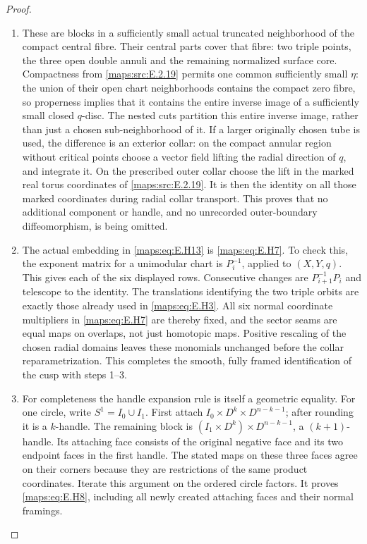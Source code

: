 \begin{proof}
\begin{enumerate}[label=\arabic*.,leftmargin=*]
\item These are blocks in a sufficiently small actual truncated
neighborhood of the compact central fibre.  Their central
parts cover that fibre: two triple points, the three open
double annuli and the remaining normalized surface core.
Compactness from \ref{maps:src:E.2.19} permits one common sufficiently small
$\eta$: the union of their open chart neighborhoods contains
the compact zero fibre, so properness implies that it contains
the entire inverse image of a sufficiently small closed
$q$-disc.  The nested cuts partition this entire inverse
image, rather than just a chosen sub-neighborhood of it.
If a larger originally chosen tube is used, the
difference is an exterior collar: on the compact annular
region without critical points choose a vector field lifting
the radial direction of $q$, and integrate it.  On the
prescribed outer collar choose the lift in the marked real
torus coordinates of \ref{maps:src:E.2.19}.  It is then the identity on all
those marked coordinates during radial collar transport.
This proves that no additional component or handle, and no
unrecorded outer-boundary diffeomorphism, is being omitted.

\item The actual embedding in \eqref{maps:eq:E.H13} is \eqref{maps:eq:E.H7}.  To check this,
the exponent matrix for a unimodular chart is $P_i^{-1}$,
applied to $(X,Y,q)$.  This gives each of the six displayed
rows.  Consecutive changes are $P_{i+1}^{-1}P_i$ and telescope
to the identity.  The translations identifying the two
triple orbits are exactly those already used in \eqref{maps:eq:E.H3}.
All six normal coordinate multipliers in \eqref{maps:eq:E.H7} are thereby
fixed, and the sector seams are equal maps on overlaps,
not just homotopic maps.  Positive rescaling of the chosen
radial domains leaves these monomials unchanged before
the collar reparametrization.  This completes the smooth,
fully framed identification of the cusp with steps 1--3.

\item For completeness the handle expansion rule is itself a
geometric equality.  For one circle, write $S^1=I_0\cup I_1$.
First attach $I_0\times D^k\times D^{n-k-1}$; after rounding it
is a $k$-handle.  The remaining block is
$(I_1\times D^k)\times D^{n-k-1}$, a $(k+1)$-handle.
Its attaching face consists of the original negative face
and its two endpoint faces in the first handle.  The stated
maps on these three faces agree on their corners because
they are restrictions of the same product coordinates.
Iterate this argument on the ordered circle factors.
It proves \eqref{maps:eq:E.H8}, including all newly created attaching
faces and their normal framings.


\end{enumerate}
\end{proof}
